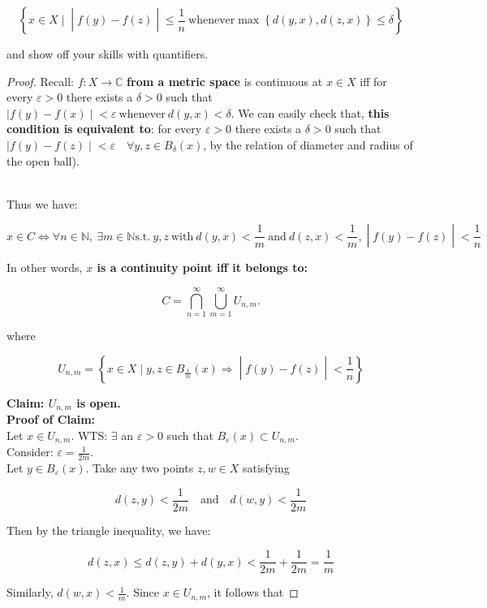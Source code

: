 \[\left\{ x \in X \mid \middle| f(y) - f(z) \middle| \leq \frac{1}{n}\ \text{whenever}\max\left\{ {d(y,x),d(z,x)} \right\} \leq \delta \right\}\]

and show off your skills with quantifiers.

\begin{proof}

Recall: \(f:X\rightarrow\mathbb{C}\) \textbf{from a metric space} is continuous at \(x \in X\) iff for every \(\varepsilon > 0\) there exists a \(\delta > 0\) such that\(\left. |f(y) - f(x) \middle| < \varepsilon\ \text{whenever}\ d(y,x) < \delta \right.\). We can easily check that, \textbf{this condition is equivalent to}: for every \(\varepsilon > 0\) there exists a \(\delta > 0\) such that \(\left. |f(y) - f(z) \middle| < \varepsilon\quad\forall y,z \in B_{\delta}(x) \right.\), by the relation of diameter and radius of the open ball).\\
\strut \\
Thus we have:

\[\left. x \in C\Leftrightarrow\forall n \in \mathbb{N},\ \exists m \in \mathbb{N}\text{s.t.}\ y,z\ \text{with}\ d(y,x) < \frac{1}{m}\ \text{and}\ d(z,x) < \frac{1}{m}, \middle| f(y) - f(z) \middle| < \frac{1}{n} \right.\]

In other words, \textbf{\(x\) is a continuity point iff it belongs to:}

\[C = \bigcap\limits_{n = 1}^{\infty}\bigcup\limits_{m = 1}^{\infty}U_{n,m}.\]

where

\[U_{n,m} = \left\{ x \in X \mid y,z \in B_{\frac{1}{m}}(x)\Longrightarrow \middle| f(y) - f(z) \middle| < \frac{1}{n} \right\}\]

\textbf{Claim: \(U_{n,m}\) is open.}\\
\textbf{Proof of Claim:}\\
Let \(x \in U_{n,m}\). WTS: \(\exists\) an \(\varepsilon > 0\) such that \(B_{\varepsilon}(x) \subset U_{n,m}\).\\
Consider: \(\varepsilon = \frac{1}{2m}\).\\
Let \(y \in B_{\varepsilon}(x)\). Take any two points \(z,w \in X\) satisfying

\[d(z,y) < \frac{1}{2m}\quad\text{and}\quad d(w,y) < \frac{1}{2m}\]

Then by the triangle inequality, we have:

\[d(z,x) \leq d(z,y) + d(y,x) < \frac{1}{2m} + \frac{1}{2m} = \frac{1}{m}\]

Similarly, \(d(w,x) < \frac{1}{m}\). Since \(x \in U_{n,m}\), it follows that


\end{proof}
